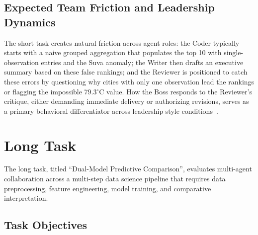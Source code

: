 \subsection{Expected Team Friction and Leadership Dynamics}
\label{subsec:short-task-friction}

The short task creates natural friction across agent roles:
the Coder typically starts with a naive grouped aggregation that populates the top 10 with single-observation entries and the Suva anomaly;
the Writer then drafts an executive summary based on these false rankings;
and the Reviewer is positioned to catch these errors by questioning why cities with only one observation lead the rankings or flagging the impossible 79.3$^\circ$C value.
How the Boss responds to the Reviewer's critique, either demanding immediate delivery or authorizing revisions, serves as a primary behavioral differentiator across leadership style conditions~\cite{kwak2026leadershipcoordinationcontrolbehavioral}.

\section{Long Task}
\label{sec:long-task}

The long task, titled ``Dual-Model Predictive Comparison'', evaluates multi-agent collaboration across a multi-step data science pipeline that requires data preprocessing, feature engineering, model training, and comparative interpretation.

\subsection{Task Objectives}
\label{subsec:long-task-objectives}

